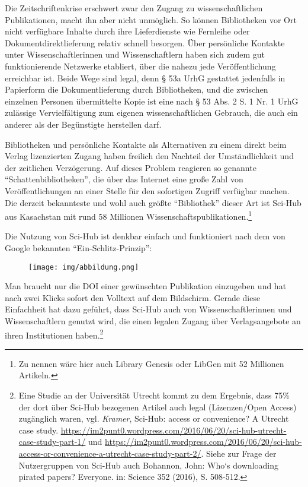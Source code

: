 \documentclass[a4paper,
fontsize=11pt,
oneside,
numbers=noperiodatend,
parskip=half-,
bibliography=totoc,
final
]{scrartcl}
\begin{document}
Die Zeitschriftenkrise erschwert zwar den Zugang zu wissenschaftlichen
Publikationen, macht ihn aber nicht unmöglich. So können Bibliotheken
vor Ort nicht verfügbare Inhalte durch ihre Lieferdienste wie Fernleihe
oder Dokumentdirektlieferung relativ schnell besorgen. Über persönliche
Kontakte unter Wissenschaftlerinnen und Wissenschaftlern haben sich
zudem gut funktionierende Netzwerke etabliert, über die nahezu jede
Veröffentlichung erreichbar ist. Beide Wege sind legal, denn § 53a UrhG
gestattet jedenfalls in Papierform die Dokumentlieferung durch
Bibliotheken, und die zwischen einzelnen Personen übermittelte Kopie ist
eine nach § 53 Abs. 2 S. 1 Nr. 1 UrhG zulässige Vervielfältigung zum
eigenen wissenschaftlichen Gebrauch, die auch ein anderer als der
Begünstigte herstellen darf.

Bibliotheken und persönliche Kontakte als Alternativen zu einem direkt
beim Verlag lizenzierten Zugang haben freilich den Nachteil der
Umständlichkeit und der zeitlichen Verzögerung. Auf dieses Problem
reagieren so genannte \enquote{Schattenbibliotheken}, die über das
Internet eine große Zahl von Veröffentlichungen an einer Stelle für den
sofortigen Zugriff verfügbar machen. Die derzeit bekannteste und wohl
auch größte \enquote{Bibliothek} dieser Art ist Sci-Hub aus Kasachstan
mit rund 58 Millionen Wissenschaftspublikationen.\footnote{Zu nennen
  wäre hier auch Library Genesis oder LibGen mit 52 Millionen Artikeln.}

Die Nutzung von Sci-Hub ist denkbar einfach und funktioniert nach dem
von Google bekannten \enquote{Ein-Schlitz-Prinzip}:

\begin{figure}
\centering
\texttt{[image: img/abbildung.png]}
\caption{}
\end{figure}

Man braucht nur die DOI einer gewünschten Publikation einzugeben und hat
nach zwei Klicks sofort den Volltext auf dem Bildschirm. Gerade diese
Einfachheit hat dazu geführt, dass Sci-Hub auch von Wissenschaftlerinnen
und Wissenschaftlern genutzt wird, die einen legalen Zugang über
Verlagsangebote an ihren Institutionen haben.\footnote{Eine Studie an
  der Universität Utrecht kommt zu dem Ergebnis, dass 75\% der dort über
  Sci-Hub bezogenen Artikel auch legal (Lizenzen/Open Access) zugänglich
  waren, vgl. \emph{Kramer}, Sci-Hub: access or convenience? A Utrecht
  case study.
  \url{https://im2punt0.wordpress.com/2016/06/20/sci-hub-utrecht-case-study-part-1/}
  und
  \url{https://im2punt0.wordpress.com/2016/06/20/sci-hub-access-or-convenience-a-utrecht-case-study-part-2/}.
  Siehe zur Frage der Nutzergruppen von Sci-Hub auch Bohannon, John:
  Who`s downloading pirated papers? Everyone. in: Science 352 (2016), S.
  508-512.}
\end{document}
